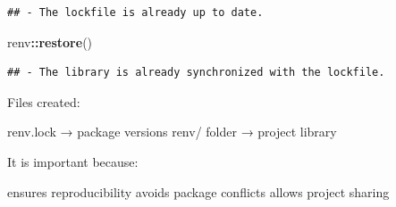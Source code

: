 \documentclass[
]{article}
\newenvironment{Shaded}{\begin{snugshade}}{\end{snugshade}}
\newcommand{\FunctionTok}[1]{\textcolor[rgb]{0.13,0.29,0.53}{\textbf{#1}}}
\newcommand{\NormalTok}[1]{#1}
\newcommand{\SpecialCharTok}[1]{\textcolor[rgb]{0.81,0.36,0.00}{\textbf{#1}}}
\begin{document}
\begin{verbatim}
## - The lockfile is already up to date.
\end{verbatim}

\begin{Shaded}
\begin{Highlighting}[]
\NormalTok{renv}\SpecialCharTok{::}\FunctionTok{restore}\NormalTok{()}
\end{Highlighting}
\end{Shaded}

\begin{verbatim}
## - The library is already synchronized with the lockfile.
\end{verbatim}

Files created:

renv.lock → package versions renv/ folder → project library

It is important because:

ensures reproducibility avoids package conflicts allows project sharing
\end{document}
